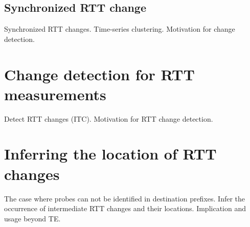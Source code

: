 \subsection{Synchronized RTT change}
Synchronized RTT changes. Time-series clustering.
Motivation for change detection.

\section{Change detection for RTT measurements}
Detect RTT changes (ITC).
Motivation for RTT change detection.

\section{Inferring the location of RTT changes}
The case where probes can not be identified in destination prefixes.
Infer the occurrence of intermediate RTT changes and their locations.
Implication and usage beyond TE.  

